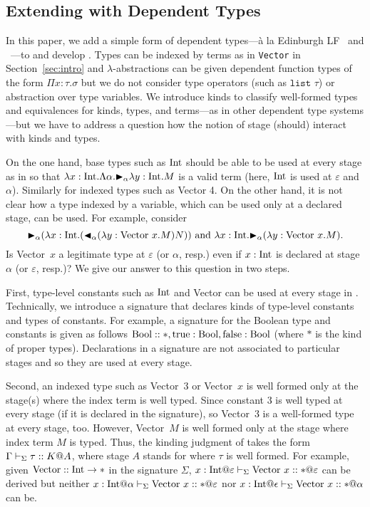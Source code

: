 \subsection{Extending \LTP with Dependent Types}

In this paper, we add a simple form of dependent types---{\`a} la
Edinburgh LF~\cite{} and \LLF~\cite{}---to \LTP and develop \LMD.
Types can be indexed by terms as in \texttt{Vector} in
Section~\ref{sec:intro} and \(\lambda\)-abstractions can be given
dependent function types of the form \(\Pi x:\tau. \sigma\) but we do
not consider type operators (such as $\texttt{list } \tau$) or
abstraction over type variables.  We introduce kinds to classify
well-formed types and equivalences for kinds, types, and terms---as
in other dependent type systems---but we have to address a question
how the notion of stage (should) interact with kinds and types.

On the one hand, base types such as \(\textrm{Int}\) should be able to be used
at every stage as in \LTP so that
\(\lambda x:\textrm{Int}.\Lambda \alpha. {\mathop{\blacktriangleright}}_\alpha \lambda y:\textrm{Int}.M\) is a valid
term (here, \(\textrm{Int}\) is used at \(\varepsilon\) and \(\alpha\)).
Similarly for indexed types such as Vector 4.  On the other hand, it
is not clear how a type indexed by a variable, which can be used only
at a declared stage, can be used.  For example,
consider
\[{\mathop{\blacktriangleright}}_\alpha (\lambda x:\textrm{Int}. ({\mathop{\blacktriangleleft}}_\alpha (\lambda y:\text{Vector
  }x.M)N) )
  \text{ and }
  \lambda x:\textrm{Int}. {\mathop{\blacktriangleright}}_\alpha (\lambda y:\text{Vector }x.M).
\]
Is Vector\ \(x\) a legitimate type at \(\varepsilon\) (or \(\alpha\),
resp.)  even if \(x:\textrm{Int}\) is declared at stage \(\alpha\) (or
\(\varepsilon\), resp.)?  We give our answer to this question in two
steps.

First, type-level constants such as \(\textrm{Int}\) and Vector can be used at
every stage in \LMD.  Technically, we introduce a signature that
declares kinds of type-level constants and types of constants.  For
example, a signature for the Boolean type and constants is given as
follows $\textrm{Bool}::*, \text{true}:\textrm{Bool}, \text{false}:\textrm{Bool}$ (where $*$ is the
kind of proper types).  Declarations in a signature are not
associated to particular stages and so they are used at every stage.

Second, an indexed type such as Vector\ 3 or Vector\ $x$ is well
formed only at the stage(s) where the index term is well typed.  Since
constant \(3\) is well typed at every stage (if it is declared in the
signature), so Vector\ 3 is a well-formed type at every stage, too.
However, Vector\ $M$ is well formed only at the stage where index term
$M$ is typed.  Thus, the kinding judgment
of \LMD takes the form \(\Gamma\vdash_\Sigma \tau :: K @ A\), where stage $A$ stands for
where \(\tau\) is well formed.  For example,
given \(\text{Vector}:: \textrm{Int} \rightarrow *\) in the signature \(\Sigma\),
\(x:\I@\varepsilon \V \text{Vector }x :: * @\varepsilon\) can be
derived but
neither
\(x:\I@\alpha \V \text{Vector }x :: * @\varepsilon\)
nor 
\(x:\I@\epsilon \V \text{Vector }x :: * @\alpha\)
can be.

